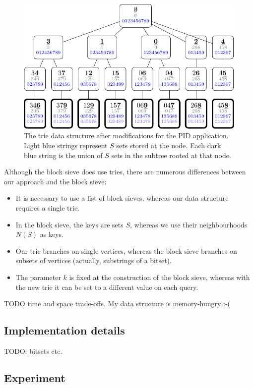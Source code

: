 \begin{figure}[htb]
\centering
\includegraphics{50-trie/img/Petersen}
\caption{The trie data structure after modifications for the PID application.
Light blue strings represent $S$ sets stored at the node.  Each dark blue string
is the union of $S$ sets in the subtree rooted at that node.}
\label{fig:viz2}
\end{figure}

Although the block sieve does use tries, there are numerous differences between
our approach and the block sieve:

\begin{itemize}
  \item It is necessary to use a list of block sieves, whereas our data structure
    requires a single trie.
  \item In the block sieve, the keys are sets $S$, whereas we use their neighbourhoods
    $N(S)$ as keys.
  \item Our trie branches on single vertices, whereas the block sieve branches
    on subsets of vertices (actually, substrings of a bitset).
  \item The parameter $k$ is fixed at the construction of the block sieve, whereas
    with the new trie it can be set to a different value on each query.
\end{itemize}

TODO time and space trade-offs.  My data structure is memory-hungry :-(

\subsection{Implementation details}

TODO: bitsets etc.

\subsection{Experiment}

